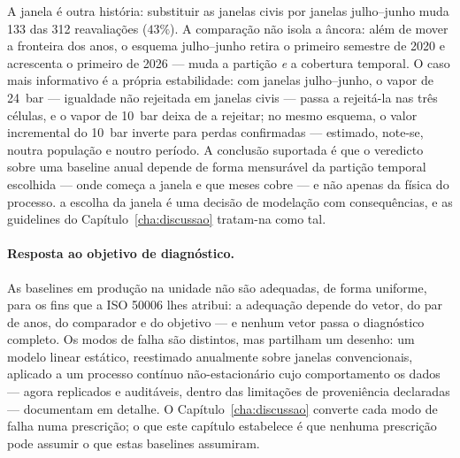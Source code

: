 A janela é outra história: substituir as janelas civis por janelas
julho--junho muda 133 das 312 reavaliações ($43\%$). A comparação não isola a
âncora: além de mover a fronteira dos anos, o esquema julho--junho retira o
primeiro semestre de 2020 e acrescenta o primeiro de 2026 --- muda a partição
\emph{e} a cobertura temporal. O caso mais informativo é a própria
estabilidade: com janelas julho--junho, o vapor de 24~bar --- igualdade não
rejeitada em janelas civis --- passa a rejeitá-la nas três células, e o vapor
de 10~bar deixa de a rejeitar; no mesmo esquema, o valor incremental do
10~bar inverte para perdas confirmadas --- estimado, note-se, noutra
população e noutro período. A conclusão suportada é que o veredicto sobre uma
baseline anual depende de forma mensurável da partição temporal escolhida ---
onde começa a janela e que meses cobre --- e não apenas da física do
processo.  a escolha da janela é uma decisão de modelação com consequências, e
as guidelines do Capítulo~\ref{cha:discussao} tratam-na como tal.

\paragraph{Resposta ao objetivo de diagnóstico.} As baselines em produção na
unidade não são adequadas, de forma uniforme, para os fins que a ISO 50006
lhes atribui: a adequação depende do vetor, do par de anos, do comparador e
do objetivo --- e nenhum vetor passa o diagnóstico completo. Os modos
de falha são distintos, mas partilham um desenho: um modelo linear
estático, reestimado anualmente sobre janelas convencionais, aplicado a um
processo contínuo não-estacionário cujo comportamento os dados --- agora
replicados e auditáveis, dentro das limitações de proveniência declaradas ---
documentam em detalhe. O Capítulo~\ref{cha:discussao} converte cada modo de
falha numa prescrição; o que este capítulo estabelece é que nenhuma prescrição pode
assumir o que estas baselines assumiram.

